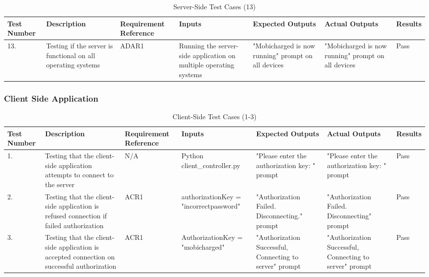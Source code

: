 \documentclass[12pt, titlepage]{article}
\begin{document}
\begin{center}
    \begin{table}[H]
        \centering
        \begin{tabular}{|p{1cm}|p{2.2cm}|p{2.5cm}|p{2.7cm}|p{2.4cm}|p{2.4cm}|p{1.3cm}|}
        \hline
        \bf Test Number & \bf Description & \bf Requirement Reference & \bf Inputs & \bf Expected Outputs & \bf Actual Outputs & \bf Results \\
        \hline
        13. & Testing if the server is functional on all operating systems & ADAR1 & Running the server-side application on multiple operating systems & "Mobicharged is now running" prompt on all devices & "Mobicharged is now running" prompt on all devices & Pass\\
        \hline
        \end{tabular}
        \caption{Server-Side Test Cases (13)}
        \label{tab:my_label6}
    \end{table}
\end{center}

\subsubsection{Client Side Application}

\begin{center}
    \begin{table}[H]
        \centering
        \begin{tabular}{|p{1cm}|p{2.2cm}|p{2.5cm}|p{2.7cm}|p{2.4cm}|p{2.4cm}|p{1.3cm}|}
        \hline
        \bf Test Number & \bf Description & \bf Requirement Reference & \bf Inputs & \bf Expected Outputs & \bf Actual Outputs & \bf Results \\
        \hline
        1. & Testing that the client-side application attempts to connect to the server & N/A & Python client\newline\_controller.py & "Please enter the authorization key: " prompt & "Please enter the authorization key: " prompt & Pass\\
        \hline
        2. & Testing that the client-side application is refused connection if failed authorization & ACR1 & authorizationKey  = "incorrectpassword" & "Authorization Failed. Disconnecting." prompt & "Authorization Failed. Disconnecting" prompt & Pass\\
        \hline
        3. & Testing that the client-side application is accepted connection on successful authorization & ACR1 & AuthorizationKey = "mobicharged" & "Authorization Successful, Connecting to server" prompt & "Authorization Successful, Connecting to server" prompt & Pass\\
        \hline
        \end{tabular}
        \caption{Client-Side Test Cases (1-3)}
        \label{tab:my_label7}
    \end{table}
\end{center}
\fancyhf{}
\fancyhead[C]{\thepage}
\renewcommand{\headrulewidth}{0pt}
\pagestyle{plain}
\end{document}
